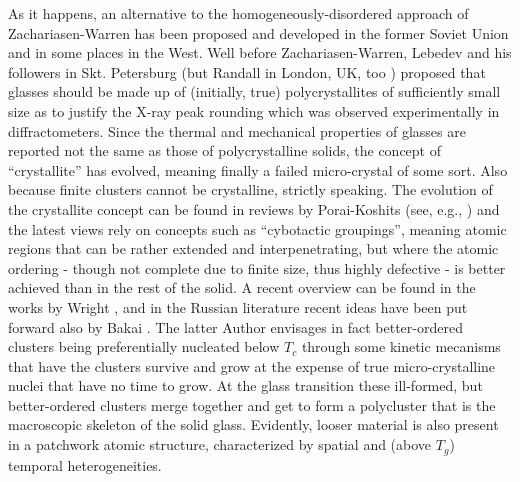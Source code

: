 \documentclass[10pt]{article}
\begin{document}
As it happens, an alternative to the homogeneously-disordered approach of 
Zachariasen-Warren has been proposed and developed in the former Soviet Union
and in some places in the West. Well before Zachariasen-Warren, Lebedev 
\cite{Leb1921} and his followers in Skt. Petersburg (but Randall in London, UK,
too \cite{Ran1930}) proposed that glasses should be made up of (initially, true) 
polycrystallites of sufficiently small size as to justify the X-ray peak rounding which 
was observed experimentally in diffractometers. Since the thermal and mechanical 
properties of glasses are reported not the same as those of polycrystalline solids, 
the concept of ``crystallite'' has evolved, meaning finally a failed micro-crystal of 
some sort. Also because finite clusters cannot be crystalline, strictly speaking. 
The evolution of the crystallite concept can be found in reviews by Porai-Koshits
(see, e.g., \cite{PK1990}) and the latest views rely on concepts such as 
``cybotactic groupings'', meaning atomic regions that can be rather extended and 
interpenetrating, but where the atomic ordering - though not complete due to 
finite size, thus highly defective - is better achieved than in the rest of the solid. 
A recent overview can be found in the works by Wright \cite{Wri2014}, and in the 
Russian literature recent ideas have been put forward also by Bakai 
\cite{Bak1994,Bak2013}. The latter Author envisages in fact better-ordered clusters 
being preferentially nucleated below $T_c$ through some kinetic mecanisms that 
have the clusters survive and grow at the expense of true micro-crystalline nuclei that 
have no time to grow. At the glass transition these ill-formed, but better-ordered 
clusters merge together and get to form a polycluster that is the macroscopic skeleton 
of the solid glass. Evidently, looser material is also present in a patchwork atomic
structure, characterized by spatial and (above $T_g$) temporal heterogeneities.
   
\end{document}
